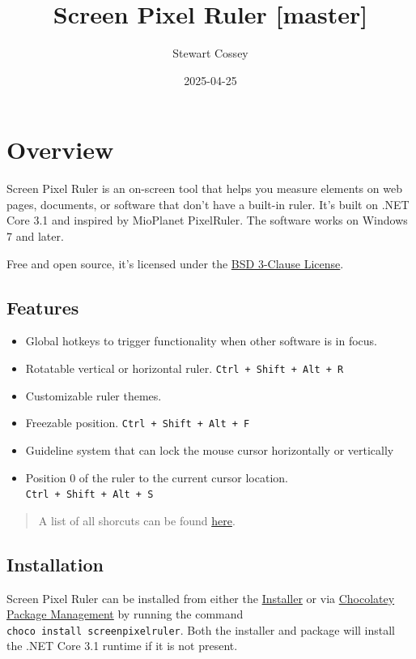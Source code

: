 \documentclass[
]{book}
\title{Screen Pixel Ruler {[}master{]}}
\author{Stewart Cossey}
\date{2025-04-25}
\providecommand{\tightlist}{%
  \setlength{\itemsep}{0pt}\setlength{\parskip}{0pt}}
\begin{document}
\maketitle

{
\setcounter{tocdepth}{1}
\tableofcontents
}
\chapter{Overview}\label{overview}

Screen Pixel Ruler is an on-screen tool that helps you measure elements on web pages, documents, or software that don't have a built-in ruler.
It's built on .NET Core 3.1 and inspired by MioPlanet PixelRuler.
The software works on Windows 7 and later.

Free and open source, it's licensed under the \href{https://opensource.org/licenses/BSD-3-Clause}{BSD 3-Clause License}.

\section{Features}\label{features}

\begin{itemize}
\tightlist
\item
  Global hotkeys to trigger functionality when other software is in focus.
\item
  Rotatable vertical or horizontal ruler. \texttt{Ctrl\ +\ Shift\ +\ Alt\ +\ R}
\item
  Customizable ruler themes.
\item
  Freezable position. \texttt{Ctrl\ +\ Shift\ +\ Alt\ +\ F}
\item
  Guideline system that can lock the mouse cursor horizontally or vertically
\item
  Position 0 of the ruler to the current cursor location. \texttt{Ctrl\ +\ Shift\ +\ Alt\ +\ S}
\end{itemize}

\begin{quote}
A list of all shorcuts can be found \hyperref[keyboard]{here}.
\end{quote}

\section{Installation}\label{installation}

Screen Pixel Ruler can be installed from either the \href{https://github.com/Cossey/ScreenPixelRuler2/releases}{Installer} or via \href{https://chocolatey.org}{Chocolatey Package Management} by running the command \texttt{choco\ install\ screenpixelruler}.
Both the installer and package will install the .NET Core 3.1 runtime if it is not present.
\end{document}
